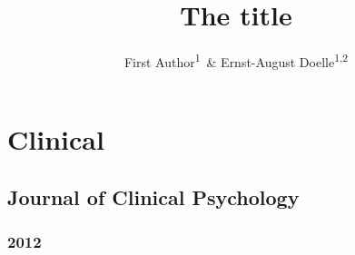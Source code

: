 \documentclass[english,man]{apa6}
\title{The title}
\author{First Author\textsuperscript{1}~\& Ernst-August Doelle\textsuperscript{1,2}}
\affiliation{
    \vspace{0.5cm}
          \textsuperscript{1} Wilhelm-Wundt-University\\
          \textsuperscript{2} Konstanz Business School  }
\theoremstyle{definition}
\theoremstyle{definition}
\theoremstyle{definition}
\theoremstyle{remark}
\begin{document}
\maketitle

\setcounter{secnumdepth}{0}



\section{Clinical}\label{clinical}

\subsection{Journal of Clinical
Psychology}\label{journal-of-clinical-psychology}

\subsubsection{2012}\label{section}
\end{document}
